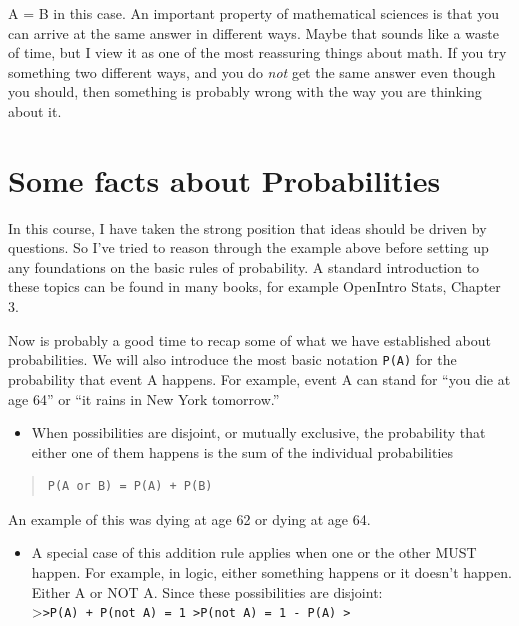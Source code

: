 \documentclass[openany]{book}
\providecommand{\tightlist}{%
  \setlength{\itemsep}{0pt}\setlength{\parskip}{0pt}}
\begin{document}
A = B in this case. An important property of mathematical sciences is that you can arrive at the same answer in different ways. Maybe that sounds like a waste of time, but I view it as one of the most reassuring things about math. If you try something two different ways, and you do \emph{not} get the same answer even though you should, then something is probably wrong with the way you are thinking about it.

\hypertarget{somefacts}{%
\chapter{Some facts about Probabilities}\label{somefacts}}

In this course, I have taken the strong position that ideas should be driven by questions. So I've tried to reason through the example above before setting up any foundations on the basic rules of probability. A standard introduction to these topics can be found in many books, for example OpenIntro Stats, Chapter 3.

Now is probably a good time to recap some of what we have established about probabilities. We will also introduce the most basic notation \texttt{P(A)} for the probability that event A happens. For example, event A can stand for ``you die at age 64'' or ``it rains in New York tomorrow.''

\begin{itemize}
\tightlist
\item
  When possibilities are disjoint, or mutually exclusive, the probability that either one of them happens is the sum of the individual probabilities
\end{itemize}

\begin{quote}
\begin{verbatim}
P(A or B) = P(A) + P(B)
\end{verbatim}
\end{quote}

An example of this was dying at age 62 or dying at age 64.

\begin{itemize}
\tightlist
\item
  A special case of this addition rule applies when one or the other MUST happen. For example, in logic, either something happens or it doesn't happen. Either A or NOT A. Since these possibilities are disjoint:
  \textgreater{}\texttt{\textgreater{}P(A)\ +\ P(not\ A)\ =\ 1\ \textgreater{}P(not\ A)\ =\ 1\ -\ P(A)\ \textgreater{}}
\end{itemize}
\end{document}
